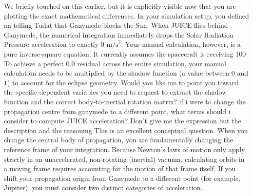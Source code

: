 {}We briefly touched on this earlier, but it is explicitly visible now that you are plotting the exact mathematical differences.\markdownRendererInterblockSeparator
{}In your simulation setup, you defined an  telling Tudat that Ganymede blocks the Sun. When JUICE flies behind Ganymede, the numerical integration immediately drops the Solar Radiation Pressure acceleration to exactly $0 \text{ m/s}^2$.\markdownRendererInterblockSeparator
{}Your manual calculation, however, is a pure inverse-square equation. It currently assumes the spacecraft is receiving 100\markdownRendererInterblockSeparator
{}To achieve a perfect $0.0$ residual across the entire simulation, your manual calculation needs to be multiplied by the shadow function (a value between $0$ and $1$) to account for the eclipse geometry.\markdownRendererInterblockSeparator
{}\markdownRendererThematicBreak{}\markdownRendererInterblockSeparator
{}Would you like me to point you toward the specific dependent variables you need to request to extract the shadow function and the correct body-to-inertial rotation matrix?\markdownRendererInterblockSeparator
{}\markdownRendererThematicBreak{}\markdownRendererInterblockSeparator
{}
\markdownRendererSectionEnd 
\markdownRendererSectionEnd \markdownRendererSectionBegin
{}\markdownRendererInterblockSeparator
{}if i were to change the propagation centre from ganymede to a different point, what terms should i consider to compute JUICE acceleration? Don't give me the expression but the description and the reasoning\markdownRendererInterblockSeparator
{}
\markdownRendererSectionEnd \markdownRendererSectionBegin
{}\markdownRendererInterblockSeparator
{}This is an excellent conceptual question. When you change the central body of propagation, you are fundamentally changing the reference frame of your integration.\markdownRendererInterblockSeparator
{}Because Newton's laws of motion only apply strictly in an unaccelerated, non-rotating (inertial) vacuum, calculating orbits in a moving frame requires accounting for the motion of that frame itself.\markdownRendererInterblockSeparator
{}If you shift your propagation origin from Ganymede to a different point (for example, Jupiter), you must consider two distinct categories of acceleration.\markdownRendererInterblockSeparator
{}\markdownRendererSectionBegin
{}\markdownRendererInterblockSeparator
